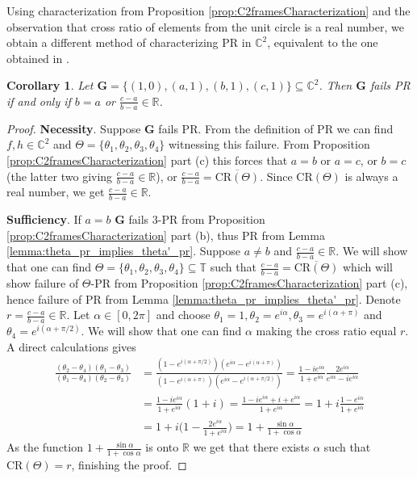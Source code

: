 \documentclass[reqno,a4paper,11pt]{amsart}
\numberwithin{equation}{section}
\newtheorem{corollary}[definition]{Corollary}
\def\R{{\mathbb R}}
\def\T{{\mathbb T}}
\def\C{{\mathbb C}}
\newcommand\1{\mathds{1}}
\newcommand{\cratio}{{\mathrm{CR}}}
\begin{document}
Using characterization from Proposition \ref{prop:C2framesCharacterization} and the observation that cross ratio of elements from the unit circle is a real number, we obtain a different method of characterizing PR in $\C^2$, equivalent to the one obtained in \cite[Theorem 1.4]{grohs2025multi}.

\begin{corollary}\label{cor:pr_C2_characterization}
    Let $\mathbf{G}=\{(1,0), (a,1), (b,1), (c,1)\}\subseteq \C^2$. Then $\mathbf{G}$ fails PR if and only if $b=a$ or $\frac{c-a}{b-a}\in \R$.
\end{corollary}
\begin{proof}
    \textbf{Necessity}. Suppose $\mathbf{G}$ fails PR. From the definition of PR we can find $f,h\in \C^2$ and $\Theta=\{\theta_1,\theta_2,\theta_3,\theta_4\}$ witnessing this failure. From Proposition \ref{prop:C2framesCharacterization} part (c) this forces that $a=b$ or $a=c$, or $b=c$ (the latter two giving $\frac{c-a}{b-a}\in \R$), or         
    $\frac{c-a}{b-a} = \overline{\cratio(\Theta)}$. Since $\cratio(\Theta)$ is always a real number, we get $\frac{c-a}{b-a}\in \R$.

    \textbf{Sufficiency}. If $a=b$ $\mathbf{G}$ fails $3$-PR from Proposition \ref{prop:C2framesCharacterization} part (b), thus PR from Lemma \ref{lemma:theta_pr_implies_theta'_pr}. Suppose $a\neq b$ and $\frac{c-a}{b-a}\in \R$. We will show that one can find $\Theta=\{\theta_1,\theta_2,\theta_3,\theta_4\}\subseteq \T$ such that $\frac{c-a}{b-a} = \overline{\cratio(\Theta)}$
    which will show failure of $\Theta$-PR from Proposition \ref{prop:C2framesCharacterization} part (c), hence failure of PR from Lemma \ref{lemma:theta_pr_implies_theta'_pr}. Denote $r=\frac{c-a}{b-a}\in \R$. Let $\alpha \in [0,2\pi]$ and choose $\theta_1=1, \theta_2=e^{i\alpha}, \theta_3 = e^{i(\alpha + \pi)}$ and $\theta_4 = e^{i(\alpha+\pi/2)}$. We will show that one can find $\alpha$ making the cross ratio equal $r$. A direct calculations gives
        \begin{align*}
        \frac{(\theta_2-\theta_4)(\theta_1 - \theta_3)}{(\theta_1-\theta_4)(\theta_2-\theta_3)}&=\frac{(1-e^{i(\alpha + \pi/2)})(e^{i\alpha} - e^{i(\alpha+\pi)})}{(1-e^{i(\alpha+\pi)})(e^{i\alpha} - e^{i(\alpha+\pi/2)})} = \frac{1-ie^{i\alpha}}{1+e^{i\alpha}}\frac{2e^{i\alpha}}{e^{i\alpha}-ie^{i\alpha}}\\
        &= \frac{1-ie^{i\alpha}}{1+e^{i\alpha}}(1+i) = \frac{1-ie^{i\alpha}+i+e^{i\alpha}}{1+e^{i\alpha}}= 1+i\frac{1-e^{i\alpha}}{1+e^{i\alpha}}\\ 
        &= 1+i\Big(1-\frac{2e^{i\alpha}}{1+e^{i\alpha}}\Big)= 1+\frac{\sin\alpha}{1+\cos\alpha} 
    \end{align*}
    As the function $1+\frac{\sin\alpha}{1+\cos\alpha}$ is onto $\R$ we get that there exists $\alpha$ such that $\cratio(\Theta)=r$, finishing the proof.
\end{proof}
\end{document}
